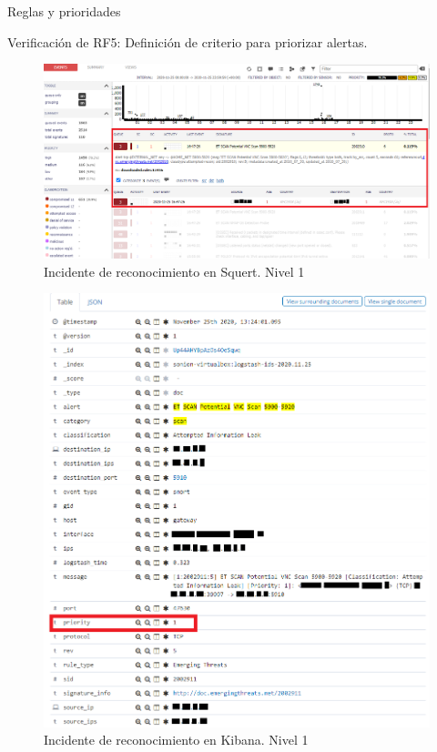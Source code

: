\begin{section}{Reglas y prioridades}
\begin{section}{Verificación de RF5: Definición de criterio para priorizar alertas.}
    \begin{figure}[H]
        \centering
        \includegraphics[width=1\textwidth]{./iteracion_3_imagenes/squert_ataque_vnc_L1-EDITADO.png}
        \caption{Incidente de reconocimiento en Squert. Nivel 1}
        \label{fig:squert-L1}
    \end{figure}
    \begin{figure}[H]
        \centering
        \includegraphics[width=1\textwidth]{./iteracion_3_imagenes/kibana_ataques_L2_2-EDITADO.png}
        \caption{Incidente de reconocimiento en Kibana. Nivel 1}
        \label{fig:kibana-L1}
    \end{figure}
    
    \end{section}

    \end{section}